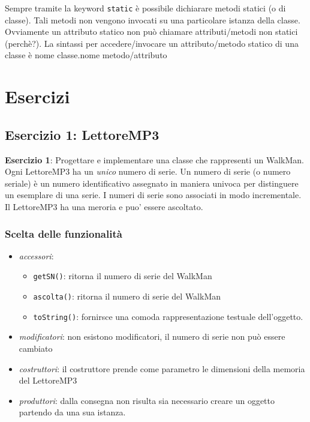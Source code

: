 \documentclass{article}
\begin{document}
Sempre tramite la keyword \texttt{static}
è possibile dichiarare metodi statici (o di classe).
Tali metodi non vengono invocati su una particolare
istanza della classe.
Ovviamente un attributo statico non può chiamare
attributi/metodi non statici (perchè?).
La sintassi per accedere/invocare un attributo/metodo statico
di una classe è
nome classe.nome metodo/attributo

\section{Esercizi}


\subsection{Esercizio 1: LettoreMP3}
\begin{framed}
\textbf{Esercizio 1}: Progettare e implementare una classe che rappresenti un WalkMan. Ogni LettoreMP3 ha un \emph{unico} numero di serie. Un numero di serie (o numero seriale) \`e un numero identificativo assegnato in maniera univoca per distinguere un esemplare di una serie. I numeri di serie sono associati in modo incrementale. Il LettoreMP3 ha una meroria e puo' essere ascoltato.
\end{framed}



\subsubsection{Scelta delle funzionalit\`a}

\begin{itemize}
\item \emph{accessori}: 
\begin{itemize}
\item \texttt{getSN()}: ritorna il numero di serie del WalkMan
\item \texttt{ascolta()}: ritorna il numero di serie del WalkMan
\item \texttt{toString()}:  fornirsce una comoda rappresentazione testuale dell'oggetto.
\end{itemize}
\item \emph{modificatori}: non esistono modificatori, il numero di serie non pu\`o essere cambiato
\item \emph{costruttori}: il costruttore prende come parametro le dimensioni della memoria del LettoreMP3
\item \emph{produttori}: dalla consegna non risulta sia necessario creare un oggetto partendo da una sua istanza.
\end{itemize}
\end{document}
